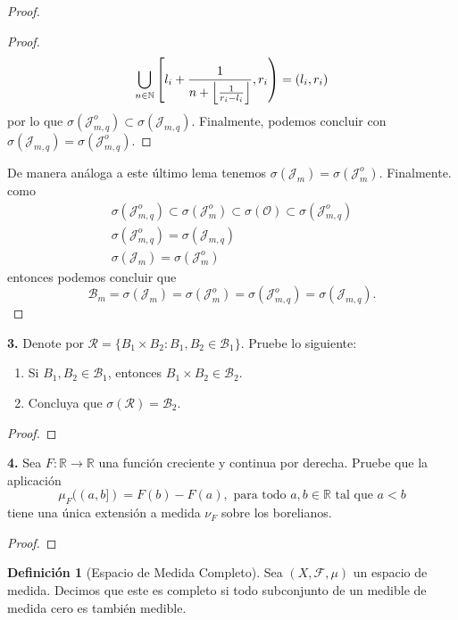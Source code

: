 \documentclass{article}
\newenvironment{statement}[1]{\smallskip\noindent\color[rgb]{1.00,0.00,0.50} {\bf #1.}}{}
\DeclarePairedDelimiter\floor{\lfloor}{\rfloor}
\theoremstyle{definition}
\newtheorem{defn}[theorem]{Definici\'on}
\theoremstyle{remark}
\newcommand{\BR}{\mathbb R}
\newcommand{\BN}{\mathbb N}
\begin{document}
\begin{proof}
\begin{proof}
    \[
      \bigcup_{n \in \BN} \left[l_i + \frac{1}{n + \floor*{\frac{1}{r_i - l_i}}}, r_i\right) = (l_i, r_i)
    \]
    por lo que $\sigma(\mathcal{J}_{m, q}^o) \subset \sigma(\mathcal{J}_{m, q})$.
    Finalmente, podemos concluir con $\sigma(\mathcal{J}_{m, q}) = \sigma(\mathcal{J}_{m, q}^o)$.
  \end{proof}
  De manera an\'aloga a este \'ultimo lema tenemos $\sigma(\mathcal{J}_m) = \sigma(\mathcal{J}_m^o)$.
  Finalmente. como
  \begin{gather*}
    \sigma(\mathcal{J}_{m, q}^o) \subset \sigma(\mathcal{J}_m^o) \subset \sigma(\mathcal{O})
    \subset \sigma(\mathcal{J}_{m, q}^o)\\
    \sigma(\mathcal{J}_{m, q}^o) = \sigma(\mathcal{J}_{m, q})\\
    \sigma(\mathcal{J}_m) = \sigma(\mathcal{J}_m^o)
  \end{gather*}
  entonces podemos concluir que
  \[
    \mathcal{B}_m = \sigma(\mathcal{J}_m) = \sigma(\mathcal{J}_m^o) =
    \sigma(\mathcal{J}_{m, q}^o) = \sigma(\mathcal{J}_{m, q}).
  \]
\end{proof}

\begin{statement}{3}
  Denote por $\mathcal{R} = \{B_1 \times B_2 : B_1, B_2 \in \mathcal{B}_1\}$.
  Pruebe lo siguiente:
  \begin{enumerate}
    \item Si $B_1, B_2 \in \mathcal{B}_1$, entonces $B_1 \times B_2 \in \mathcal{B}_2$.
    \item Concluya que $\sigma(\mathcal{R}) = \mathcal{B}_2$.
  \end{enumerate}
\end{statement}

\begin{proof}
\end{proof}

\begin{statement}{4}
  Sea $F: \BR \to \BR$ una funci\'on creciente y continua por derecha.
  Pruebe que la aplicaci\'on
  \[
    \mu_F((a, b]) = F(b) - F(a), \text{ para todo } a, b \in \BR \text{ tal que } a < b
  \]
  tiene una \'unica extensi\'on a medida $\nu_F$ sobre los borelianos.
\end{statement}

\begin{proof}
\end{proof}

\begin{defn}[Espacio de Medida Completo]
  Sea $(X, \mathcal{F}, \mu)$ un espacio de medida. Decimos que este es completo
  si todo subconjunto de un medible de medida cero es tambi\'en medible.
\end{defn}
\end{document}

